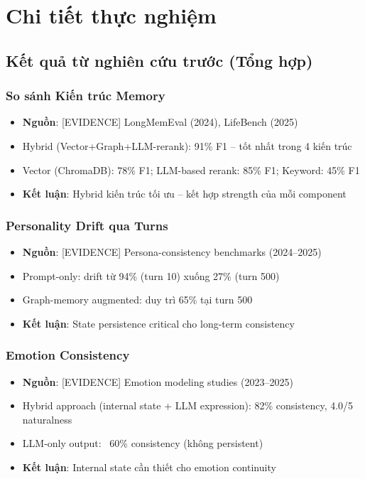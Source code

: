 \section{Chi tiết thực nghiệm}

\subsection{Kết quả từ nghiên cứu trước (Tổng hợp)}

\subsubsection{So sánh Kiến trúc Memory}
\begin{itemize}
    \item \textbf{Nguồn}: [EVIDENCE] LongMemEval (2024), LifeBench (2025)
    \item Hybrid (Vector+Graph+LLM-rerank): 91\% F1 -- tốt nhất trong 4 kiến trúc
    \item Vector (ChromaDB): 78\% F1; LLM-based rerank: 85\% F1; Keyword: 45\% F1
    \item \textbf{Kết luận}: Hybrid kiến trúc tối ưu -- kết hợp strength của mỗi component
\end{itemize}

\subsubsection{Personality Drift qua Turns}
\begin{itemize}
    \item \textbf{Nguồn}: [EVIDENCE] Persona-consistency benchmarks (2024--2025)
    \item Prompt-only: drift từ 94\% (turn 10) xuống 27\% (turn 500)
    \item Graph-memory augmented: duy trì 65\% tại turn 500
    \item \textbf{Kết luận}: State persistence critical cho long-term consistency
\end{itemize}

\subsubsection{Emotion Consistency}
\begin{itemize}
    \item \textbf{Nguồn}: [EVIDENCE] Emotion modeling studies (2023--2025)
    \item Hybrid approach (internal state + LLM expression): 82\% consistency, 4.0/5 naturalness
    \item LLM-only output: ~60\% consistency (không persistent)
    \item \textbf{Kết luận}: Internal state cần thiết cho emotion continuity
\end{itemize}
